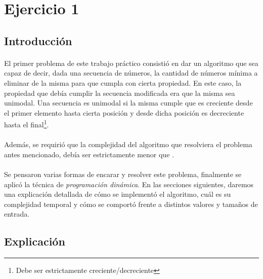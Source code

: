 \section{Ejercicio 1}


\subsection{Introducción}

\paragraph{}
El primer problema de este trabajo práctico consistió en dar un algoritmo que sea capaz de decir, dada una secuencia de números, la cantidad de números mínima a eliminar de la misma para que cumpla con cierta propiedad. En este caso, la propiedad que debía cumplir la secuencia  modificada era que la misma sea unimodal. Una secuencia es unimodal si la misma cumple que es creciente desde el primer elemento hasta cierta posición y desde dicha posición es decreciente hasta el final\footnote{Debe ser estrictamente creciente/decreciente}.

\paragraph{}
Además, se requirió que la complejidad del algoritmo que resolviera el problema antes mencionado, debía ser estrictamente menor que .

\paragraph{}
Se pensaron varias formas de encarar y resolver este problema, finalmente se aplicó la técnica de \textit{programación dinámica}. En las secciones siguientes, daremos una explicación detallada de cómo se implementó el algoritmo, cuál es su complejidad temporal y cómo se comportó frente a distintos valores y tamaños de entrada.


\subsection{Explicación}

